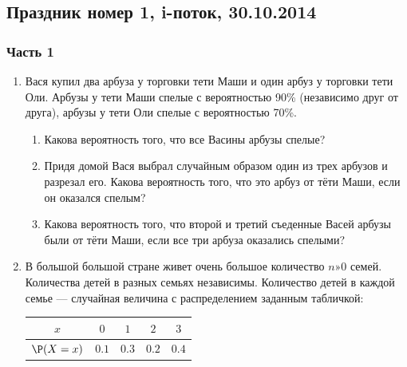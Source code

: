\subsection{Праздник номер 1, i-поток, 30.10.2014}

\subsubsection*{ Часть 1}

\begin{enumerate}


\item Вася купил два арбуза у торговки тети Маши и один арбуз у торговки тети Оли. Арбузы у тети Маши спелые с вероятностью 90\% (независимо друг от друга), арбузы у тети Оли спелые с вероятностью 70\%.

\begin{enumerate}
\item Какова вероятность того, что все Васины арбузы спелые?
\item Придя домой Вася выбрал случайным образом один из трех арбузов и разрезал его. Какова вероятность того, что это арбуз от тёти Маши, если он оказался спелым?
\item Какова вероятность того, что второй и третий съеденные Васей арбузы были от тёти Маши, если все три арбуза оказались спелыми?
\end{enumerate}


\item В большой большой стране живет очень большое количество $n»0$ семей. Количества детей в разных семьях независимы. Количество детей в каждой семье — случайная величина с распределением заданным табличкой:

\begin{tabular}{ccccc}
\toprule
$x$ & $0$ & $1$ & $2$ & $3$ \\ \midrule
$\P(X=x)$ & $0.1$ & $0.3$ & $0.2$ & $0.4$ \\ \bottomrule
\end{tabular}


\end{enumerate}

